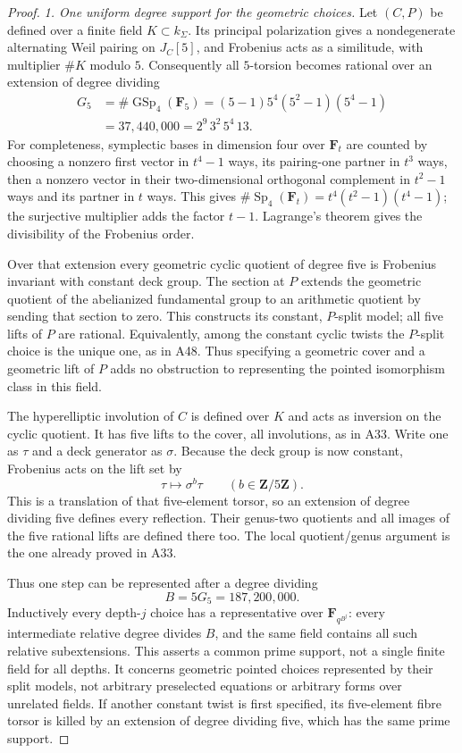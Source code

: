 \begin{proof}
\emph{1. One uniform degree support for the geometric choices.}
Let $(C,P)$ be defined over a finite field $K\subset k_\Sigma$.
Its principal polarization gives a nondegenerate alternating Weil
pairing on $J_C[5]$, and Frobenius acts as a similitude, with
multiplier $\#K$ modulo $5$. Consequently all $5$-torsion becomes
rational over an extension of degree dividing
\[
 \begin{aligned}
 G_5&=\#\operatorname{GSp}_4(\mathbf F_5)
      =(5-1)5^4(5^2-1)(5^4-1)\\
    &=37{,}440{,}000=2^9\,3^2\,5^4\,13.
 \end{aligned}
 \tag{FI.2}
\]
For completeness, symplectic bases in dimension four over
$\mathbf F_t$ are counted by choosing a nonzero first vector
in $t^4-1$ ways, its pairing-one partner in $t^3$ ways, then
a nonzero vector in their two-dimensional orthogonal complement
in $t^2-1$ ways and its partner in $t$ ways. This gives
$\#\operatorname{Sp}_4(\mathbf F_t)=t^4(t^2-1)(t^4-1)$;
the surjective multiplier adds the factor $t-1$.
Lagrange's theorem gives the divisibility of the Frobenius order.

Over that extension every geometric cyclic quotient of degree five is
Frobenius invariant with constant deck group. The section at $P$
extends the geometric quotient of the abelianized fundamental group
to an arithmetic quotient by sending that section to zero. This
constructs its constant, $P$-split model; all five lifts of $P$
are rational. Equivalently, among the constant cyclic twists the
$P$-split choice is the unique one, as in A48. Thus specifying a
geometric cover and a geometric lift of $P$ adds no obstruction
to representing the pointed isomorphism class in this field.

The hyperelliptic involution of $C$ is defined over $K$ and acts
as inversion on the cyclic quotient. It has five lifts to the
cover, all involutions, as in A33. Write one as $\tau$ and a deck
generator as $\sigma$. Because the deck group is now constant,
Frobenius acts on the lift set by
\[
                  \tau\longmapsto\sigma^b\tau
                  \qquad(b\in\mathbf Z/5\mathbf Z).
 \tag{FI.3}
\]
This is a translation of that five-element torsor, so an extension
of degree dividing five defines every reflection. Their genus-two
quotients and all images of the five rational lifts are defined
there too. The local quotient/genus argument is the one already
proved in A33.

Thus one step can be represented after a degree dividing
\[
                  B=5G_5=187{,}200{,}000.
 \tag{FI.4}
\]
Inductively every depth-$j$ choice has a representative over
$\mathbf F_{q^{B^j}}$: every intermediate relative degree divides
$B$, and the same field contains all such relative subextensions.
This asserts a common prime support, not a single finite field
for all depths. It concerns geometric pointed choices represented
by their split models, not arbitrary preselected equations or
arbitrary forms over unrelated fields. If another constant twist
is first specified, its five-element fibre torsor is killed by
an extension of degree dividing five, which has the same prime
support.


\end{proof}
